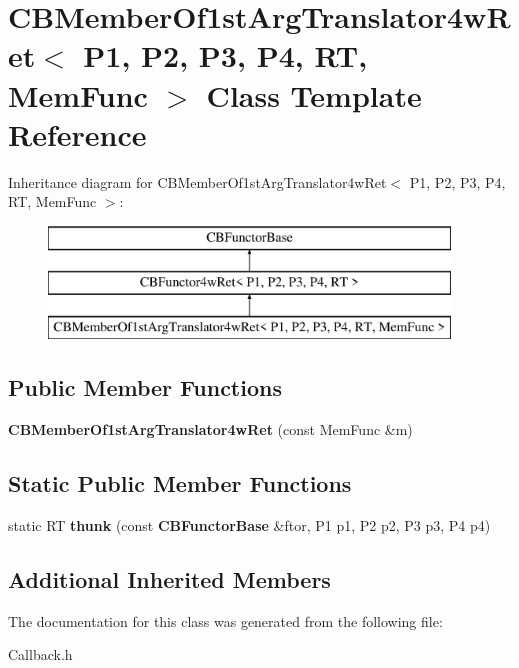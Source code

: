 \section{C\+B\+Member\+Of1st\+Arg\+Translator4w\+Ret$<$ P1, P2, P3, P4, RT, Mem\+Func $>$ Class Template Reference}
\label{classCBMemberOf1stArgTranslator4wRet}
Inheritance diagram for C\+B\+Member\+Of1st\+Arg\+Translator4w\+Ret$<$ P1, P2, P3, P4, RT, Mem\+Func $>$\+:\begin{figure}[H]
\begin{center}
\leavevmode
\includegraphics[height=3.000000cm]{classCBMemberOf1stArgTranslator4wRet}
\end{center}
\end{figure}
\subsection*{Public Member Functions}
\begin{DoxyCompactItemize}
\item 
{\bfseries C\+B\+Member\+Of1st\+Arg\+Translator4w\+Ret} (const Mem\+Func \&m)\label{classCBMemberOf1stArgTranslator4wRet_a26df225ad41821d1b66bbe2d52a1af49}

\end{DoxyCompactItemize}
\subsection*{Static Public Member Functions}
\begin{DoxyCompactItemize}
\item 
static RT {\bfseries thunk} (const {\bf C\+B\+Functor\+Base} \&ftor, P1 p1, P2 p2, P3 p3, P4 p4)\label{classCBMemberOf1stArgTranslator4wRet_a941353b6cd743478e22eb62bba0e4ca4}

\end{DoxyCompactItemize}
\subsection*{Additional Inherited Members}


The documentation for this class was generated from the following file\+:\begin{DoxyCompactItemize}
\item 
Callback.\+h\end{DoxyCompactItemize}
